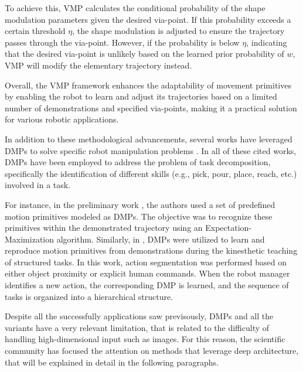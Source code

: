 To achieve this, VMP calculates the conditional probability of the shape modulation parameters given the desired via-point. If this probability exceeds a certain threshold \( \eta \), the shape modulation is adjusted to ensure the trajectory passes through the via-point. However, if the probability is below \( \eta \), indicating that the desired via-point is unlikely based on the learned prior probability of \( w \), VMP will modify the elementary trajectory instead.

Overall, the VMP framework enhances the adaptability of movement primitives by enabling the robot to learn and adjust its trajectories based on a limited number of demonstrations and specified via-points, making it a practical solution for various robotic applications.

In addition to these methodological advancements, several works have leveraged DMPs to solve specific robot manipulation problems \cite{meier2011movement_primitive,caccavale2019kinesthetic,agostini2020manipulation}. In all of these cited works, DMPs have been employed to address the problem of task decomposition, specifically the identification of different skills (e.g., pick, pour, place, reach, etc.) involved in a task. 

For instance, in the preliminary work \cite{meier2011movement_primitive}, the authors used a set of predefined motion primitives modeled as DMPs. The objective was to recognize these primitives within the demonstrated trajectory using an Expectation-Maximization algorithm. Similarly, in \cite{caccavale2019kinesthetic}, DMPs were utilized to learn and reproduce motion primitives from demonstrations during the kinesthetic teaching of structured tasks. In this work, action segmentation was performed based on either object proximity or explicit human commands. When the robot manager identifies a new action, the corresponding DMP is learned, and the sequence of tasks is organized into a hierarchical structure.

Despite all the successfully applications saw previsously, DMPs and all the variants have a very relevant limitation, that is related to the difficulty of handling high-dimensional input such as images. For this reason, the scientific community has focused the attention on methods that leverage deep architecture, that will be explained in detail in the following paragraphs.



% 
% 